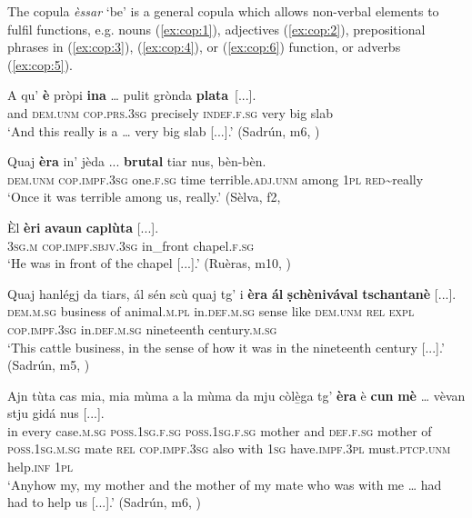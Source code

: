 The copula \textit{èssar} `be' is a general copula which allows non-verbal elements to fulfil  functions, e.g. nouns (\ref{ex:cop:1}), adjectives (\ref{ex:cop:2}), prepositional phrases in  (\ref{ex:cop:3}),  (\ref{ex:cop:4}), or  (\ref{ex:cop:6}) function, or adverbs (\ref{ex:cop:5}).

\ea
\label{ex:cop:1}
	\gll    A qu’ \textbf{è} pròpi \textbf{ina} … pulit grònda \textbf{plata}~[...].\\
	and \textsc{dem.unm} \textsc{cop.prs.3sg} precisely \textsc{indef.f.sg} {} very big slab\\
\glt `And this really is a … very big slab [...].' (Sadrún, m6, )
\z

\ea
\label{ex:cop:2}
\gll Quaj \textbf{èra} in’ jèda ... \textbf{brutal} tiar nus, bèn-bèn.\\
\textsc{dem.unm} \textsc{cop.impf.3sg} one.\textsc{f.sg} time {} terrible.\textsc{adj.unm} among \textsc{1pl} \textsc{red}\textasciitilde{really}\\
\glt `Once it was terrible among us, really.' (Sèlva, f2, 
\z

\ea
\label{ex:cop:3}
\gll  Èl \textbf{èri} \textbf{avaun} \textbf{caplùta} [...].\\
\textsc{3sg.m} \textsc{cop.impf.sbjv.3sg} in\_front chapel.\textsc{f.sg}\\
\glt `He was in front of the chapel [...].' (Ruèras, m10, )
\z

\ea
\label{ex:cop:4}
\gll Quaj hanlégj da tiars, ál sén scù quaj tg' i \textbf{èra} \textbf{ál} \textbf{ṣchènivával} \textbf{tschantanè} [...].\\
	\textsc{dem.m.sg} business of animal.\textsc{m.pl} in.\textsc{def.m.sg} sense like \textsc{dem.unm} \textsc{rel} \textsc{expl} \textsc{cop.impf.3sg} in.\textsc{def.m.sg} nineteenth century.\textsc{m.sg}\\
\glt`This cattle business, in the sense of how it was in the nineteenth century [...].' (Sadrún, m5, )
\z

\ea
\label{ex:cop:6}
\gll    Ajn tùta cas mia, mia mùma a la mùma da mju còlè̱ga tg’ \textbf{èra} è \textbf{cun} \textbf{mè} … vèvan stju gidá nus [...].\\
in every case.\textsc{m.sg} \textsc{poss.1sg.f.sg}  \textsc{poss.1sg.f.sg} mother and \textsc{def.f.sg} mother of  \textsc{poss.1sg.m.sg} mate \textsc{rel}  \textsc{cop.impf.3sg} also with \textsc{1sg} {} have.\textsc{impf.3pl} must.\textsc{ptcp.unm} help.\textsc{inf} \textsc{1pl}\\
\glt `Anyhow my, my mother and the mother of my mate who was with me … had had to help us [...].' (Sadrún, m6, )
\z

